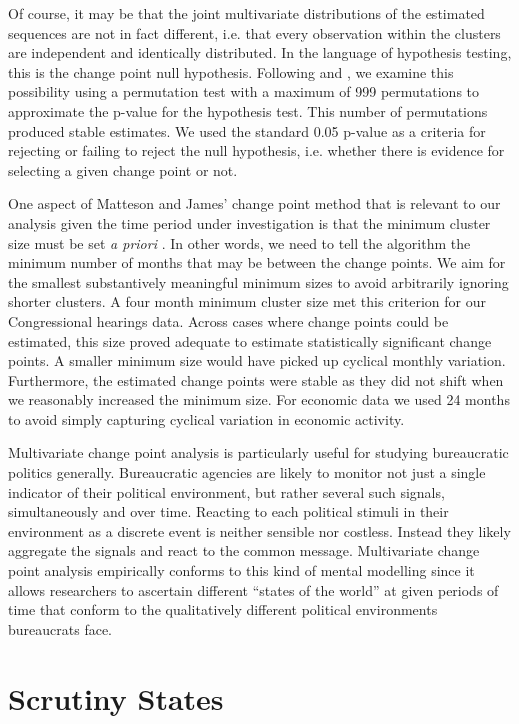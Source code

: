 \documentclass[a4paper]{article}\usepackage[]{graphicx}\usepackage[]{color}
\begin{document}
Of course, it may be that the joint multivariate distributions of the estimated sequences are not in fact different, i.e. that every observation within the clusters are independent and identically distributed. In the language of hypothesis testing, this is the change point null hypothesis. Following \cite{Matteson2014} and \cite{Rizzo2010}, we examine this possibility using a permutation test with a maximum of 999 permutations to approximate the p-value for the hypothesis test. This number of permutations produced stable estimates. We used the standard 0.05 p-value as a criteria for rejecting or failing to reject the null hypothesis, i.e. whether there is evidence for selecting a given change point or not.

One aspect of Matteson and James' change point method that is relevant to our analysis given the time period under investigation is that the minimum cluster size must be set \emph{a priori} \citeyearpar[337]{Matteson2014}. In other words, we need to tell the algorithm the minimum number of months that may be between the change points. We aim for the smallest substantively meaningful minimum sizes to avoid arbitrarily ignoring shorter clusters. A four month minimum cluster size met this criterion for our Congressional hearings data. Across cases where change points could be estimated, this size proved adequate to estimate statistically significant change points. A smaller minimum size would have picked up cyclical monthly variation. Furthermore, the estimated change points were stable as they did not shift when we reasonably increased the minimum size. For economic data we used 24 months to avoid simply capturing cyclical variation in economic activity.

Multivariate change point analysis is particularly useful for studying bureaucratic politics generally. Bureaucratic agencies are likely to monitor not just a single indicator of their political environment, but rather several such signals, simultaneously and over time. Reacting to each political stimuli in their environment as a discrete event is neither sensible nor costless. Instead they likely aggregate the signals and react to the common message. Multivariate change point analysis empirically conforms to this kind of mental modelling since it allows researchers to ascertain different ``states of the world'' at given periods of time that conform to the qualitatively different political environments bureaucrats face.

\section{Scrutiny States}
\end{document}
